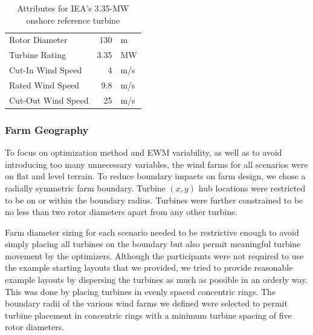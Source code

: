 	\begin{table}[H]
		\begin{center}
			\caption{Attributes for IEA's 3.35-MW onshore reference turbine}
			\label{tab:turb-att}
			\begin{tabular}{@{}lrl@{}}
			\toprule
				Rotor Diameter & 130 & m \\ 
				Turbine Rating & 3.35 & MW \\ 
				Cut-In Wind Speed & 4 & m/s \\ 
				Rated Wind Speed & 9.8 & m/s \\ 
				Cut-Out Wind Speed & 25 & m/s \\
			\bottomrule
			\end{tabular}
		\end{center}
	\end{table}
	
\subsubsection{Farm Geography}\label{sec:farmgeog}

	To focus on optimization method and EWM variability, as well as to avoid introducing too many unnecessary variables, the wind farms for all scenarios were on flat and level terrain.
	To reduce boundary impacts on farm design, we chose a radially symmetric farm boundary.
	Turbine $(x, y)$ hub locations were restricted to be on or within the boundary radius.
	Turbines were further constrained to be no less than two rotor diameters apart from any other turbine.

	Farm diameter sizing for each scenario needed to be restrictive enough to avoid simply placing all turbines on the boundary but also permit meaningful turbine movement by the optimizers.
	Although the participants were not required to use the example starting layouts that we provided, we tried to provide reasonable example layouts by dispersing the turbines as much as possible in an orderly way. This was done by placing turbines in evenly spaced concentric rings. The boundary radii of the various wind farms we defined were selected to permit turbine placement in concentric rings with a minimum turbine spacing of five rotor diameters.

